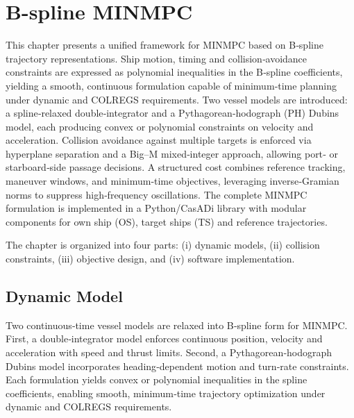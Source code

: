 
\chapter{B-spline MINMPC}\label{chap:b-spline-minmpc}

This chapter presents a unified framework for \acrfull{MINMPC} based on B‐spline trajectory representations. Ship motion, timing and collision‐avoidance constraints are expressed as polynomial inequalities in the B‐spline coefficients, yielding a smooth, continuous formulation capable of minimum‐time planning under dynamic and COLREGS requirements. Two vessel models are introduced: a spline‐relaxed double‐integrator and a Pythagorean‐hodograph (PH) Dubins model, each producing convex or polynomial constraints on velocity and acceleration. Collision avoidance against multiple targets is enforced via hyperplane separation and a Big–M mixed‐integer approach, allowing port‐ or starboard‐side passage decisions. A structured cost combines reference tracking, maneuver windows, and minimum‐time objectives, leveraging inverse‐Gramian norms to suppress high‐frequency oscillations. The complete MINMPC formulation is implemented in a Python/CasADi library with modular components for own ship (\acrshort{OS}), target ships (\acrshort{TS}) and reference trajectories. 

The chapter is organized into four parts: (i) dynamic models, (ii) collision constraints, (iii) objective design, and (iv) software implementation.


\section{Dynamic Model}

Two continuous‐time vessel models are relaxed into B‐spline form for MINMPC. First, a double‐integrator model enforces continuous position, velocity and acceleration with speed and thrust limits. Second, a Pythagorean‐hodograph Dubins model incorporates heading‐dependent motion and turn‐rate constraints. Each formulation yields convex or polynomial inequalities in the spline coefficients, enabling smooth, minimum‐time trajectory optimization under dynamic and COLREGS requirements.


